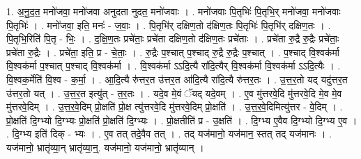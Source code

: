 \documentclass[17pt]{extarticle}
\begin{document}
1. अ॒नु॒द॒त॒ मनो॑जवा॒ मनो॑जवा अनुदता नुदत॒ मनो॑जवाः । . मनो॑जवाः पि॒तृभिः॑ पि॒तृभि॒र् मनो॑जवा॒ मनो॑जवाः पि॒तृभिः॑ । . मनो॑जवा॒ इति॒ मनः॑ - ज॒वाः॒ । . पि॒तृभि॑र् दक्षिण॒तो द॑क्षिण॒तः पि॒तृभिः॑ पि॒तृभि॑र् दक्षिण॒तः । . पि॒तृभि॒रिति॑ पि॒तृ - भिः॒ । . द॒क्षि॒ण॒तः प्रचे॑ताः॒ प्रचे॑ता दक्षिण॒तो द॑क्षिण॒तः प्रचे॑ताः । . प्रचे॑ता रु॒द्रै रु॒द्रैः प्रचे॑ताः॒ प्रचे॑ता रु॒द्रैः । . प्रचे॑ता॒ इति॒ प्र - चे॒ताः॒ । . रु॒द्रैः प॒श्चात् प॒श्चाद् रु॒द्रै रु॒द्रैः प॒श्चात् । . प॒श्चाद् वि॒श्वक॑र्मा वि॒श्वक॑र्मा प॒श्चात् प॒श्चाद् वि॒श्वक॑र्मा । . वि॒श्वक॑र्मा ऽऽदि॒त्यै रा॑दि॒त्यैर् वि॒श्वक॑र्मा वि॒श्वक॑र्मा ऽऽदि॒त्यैः । . वि॒श्वक॒र्मेति॑ वि॒श्व - क॒र्मा॒ । . आ॒दि॒त्यै रु॑त्तर॒त उ॑त्तर॒त आ॑दि॒त्यै रा॑दि॒त्यै रु॑त्तर॒तः । . उ॒त्त॒र॒तो यद् यदु॑त्तर॒त उ॑त्तर॒तो यत् । . उ॒त्त॒र॒त इत्यु॑त् - त॒र॒तः । . यदे॒व मे॒वं ॅयद् यदे॒वम् । . ए॒व मु॑त्तरवे॒दि मु॑त्तरवे॒दि मे॒व मे॒व मु॑त्तरवे॒दिम् । . उ॒त्त॒र॒वे॒दिम् प्रो॒क्षति॑ प्रो॒क्ष त्यु॑त्तरवे॒दि मु॑त्तरवे॒दिम् प्रो॒क्षति॑ । . उ॒त्त॒र॒वे॒दिमित्यु॑त्तर - वे॒दिम् । . प्रो॒क्षति॑ दि॒ग्भ्यो दि॒ग्भ्यः प्रो॒क्षति॑ प्रो॒क्षति॑ दि॒ग्भ्यः । . प्रो॒क्षतीति॑ प्र - उ॒क्षति॑ । . दि॒ग्भ्य ए॒वैव दि॒ग्भ्यो दि॒ग्भ्य ए॒व । . दि॒ग्भ्य इति॑ दिक् - भ्यः । . ए॒व तत् तदे॒वैव तत् । . तद् यज॑मानो॒ यज॑मान॒ स्तत् तद् यज॑मानः । . यज॑मानो॒ भ्रातृ॑व्या॒न् भ्रातृ॑व्या॒न्॒. यज॑मानो॒ यज॑मानो॒ भ्रातृ॑व्यान् । \newline
\end{document}
